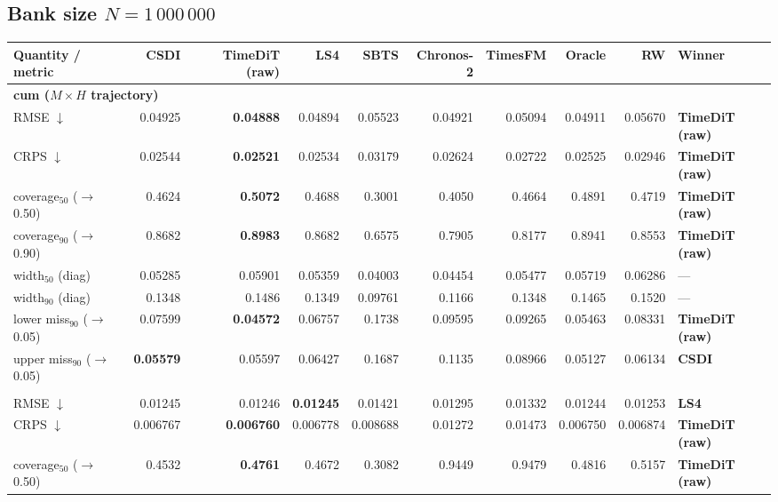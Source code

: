 \documentclass[11pt,a4paper]{article}
\begin{document}
\begin{landscape}
\subsection{Bank size $N = 1\,000\,000$}
\begin{center}\footnotesize
\begin{tabular}{lrrrrrrrrl}
\toprule
Quantity / metric & CSDI & TimeDiT (raw) & LS4 & SBTS & Chronos-2 & TimesFM & Oracle & RW & Winner \\
\midrule
\multicolumn{10}{l}{\textbf{cum ($M\times H$ trajectory)}} \\
RMSE $\downarrow$ & 0.04925 & \textbf{0.04888} & 0.04894 & 0.05523 & 0.04921 & 0.05094 & 0.04911 & 0.05670 & \textbf{TimeDiT (raw)} \\
CRPS $\downarrow$ & 0.02544 & \textbf{0.02521} & 0.02534 & 0.03179 & 0.02624 & 0.02722 & 0.02525 & 0.02946 & \textbf{TimeDiT (raw)} \\
coverage$_{50}$ ($\to$0.50) & 0.4624 & \textbf{0.5072} & 0.4688 & 0.3001 & 0.4050 & 0.4664 & 0.4891 & 0.4719 & \textbf{TimeDiT (raw)} \\
coverage$_{90}$ ($\to$0.90) & 0.8682 & \textbf{0.8983} & 0.8682 & 0.6575 & 0.7905 & 0.8177 & 0.8941 & 0.8553 & \textbf{TimeDiT (raw)} \\
width$_{50}$ (diag) & 0.05285 & 0.05901 & 0.05359 & 0.04003 & 0.04454 & 0.05477 & 0.05719 & 0.06286 & --- \\
width$_{90}$ (diag) & 0.1348 & 0.1486 & 0.1349 & 0.09761 & 0.1166 & 0.1348 & 0.1465 & 0.1520 & --- \\
lower miss$_{90}$ ($\to$0.05) & 0.07599 & \textbf{0.04572} & 0.06757 & 0.1738 & 0.09595 & 0.09265 & 0.05463 & 0.08331 & \textbf{TimeDiT (raw)} \\
upper miss$_{90}$ ($\to$0.05) & \textbf{0.05579} & 0.05597 & 0.06427 & 0.1687 & 0.1135 & 0.08966 & 0.05127 & 0.06134 & \textbf{CSDI} \\
\addlinespace
\multicolumn{10}{l}{\textbf{step ($M\times H$)}} \\
RMSE $\downarrow$ & 0.01245 & 0.01246 & \textbf{0.01245} & 0.01421 & 0.01295 & 0.01332 & 0.01244 & 0.01253 & \textbf{LS4} \\
CRPS $\downarrow$ & 0.006767 & \textbf{0.006760} & 0.006778 & 0.008688 & 0.01272 & 0.01473 & 0.006750 & 0.006874 & \textbf{TimeDiT (raw)} \\
coverage$_{50}$ ($\to$0.50) & 0.4532 & \textbf{0.4761} & 0.4672 & 0.3082 & 0.9449 & 0.9479 & 0.4816 & 0.5157 & \textbf{TimeDiT (raw)} \\

\end{tabular}
\end{center}
\end{landscape}
\end{document}
